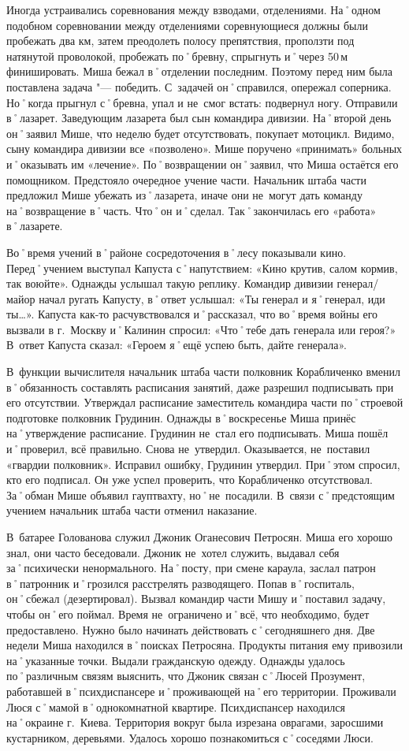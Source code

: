 Иногда устраивались соревнования между взводами, отделениями. На˚одном подобном соревновании между отделениями соревнующиеся должны были пробежать два км, затем преодолеть полосу препятствия, проползти под натянутой проволокой, пробежать по˚бревну, спрыгнуть и˚через 50\,м финишировать. Миша бежал в˚отделении последним. Поэтому перед ним была поставлена задача "--- победить. С~задачей он˚справился, опережал соперника. Но˚когда прыгнул с˚бревна, упал и не~смог встать: подвернул ногу. Отправили в˚лазарет. Заведующим лазарета был сын командира дивизии. На˚второй день он˚заявил Мише, что неделю будет отсутствовать, покупает мотоцикл. Видимо, сыну командира дивизии все «позволено». Мише поручено «принимать» больных и˚оказывать им «лечение». По˚возвращении он˚заявил, что Миша остаётся его помощником. Предстояло очередное учение части. Начальник штаба части предложил Мише убежать из˚лазарета, иначе они не~могут дать команду на˚возвращение в˚часть. Что˚он и˚сделал. Так˚закончилась его «работа» в˚лазарете.

Во˚время учений в˚районе сосредоточения в˚лесу показывали кино. Перед˚учением выступал Капуста с˚напутствием: «Кино крутив, салом кормив, так воюйте». Однажды услышал такую реплику. Командир дивизии генерал\-/майор начал ругать Капусту, в˚ответ услышал: «Ты генерал и я˚генерал, иди ты…». Капуста как-то расчувствовался и˚рассказал, что во˚время войны его вызвали в г.~Москву и˚Калинин спросил: «Что˚тебе дать генерала или героя?» В~ответ Капуста сказал: «Героем я˚ещё успею быть, дайте генерала». 

В~функции вычислителя начальник штаба части полковник Корабличенко вменил в˚обязанность составлять расписания занятий, даже разрешил подписывать при его отсутствии. Утверждал расписание заместитель командира части по˚строевой подготовке полковник Грудинин. Однажды в˚воскресенье Миша принёс на˚утверждение расписание. Грудинин не~стал его подписывать. Миша пошёл и˚проверил, всё правильно. Снова не~утвердил. Оказывается, не~поставил «гвардии полковник». Исправил ошибку, Грудинин утвердил. При˚этом спросил, кто его подписал. Он уже успел проверить, что Корабличенко отсутствовал. За˚обман Мише объявил гауптвахту, но˚не~посадили. В~связи с˚предстоящим учением начальник штаба части отменил наказание.


В~батарее Голованова служил Джоник Оганесович Петросян. Миша его хорошо знал, они часто беседовали. Джоник не~хотел служить, выдавал себя за˚психически ненормального. На˚посту, при смене караула, заслал патрон в˚патронник и˚грозился расстрелять разводящего. Попав в˚госпиталь, он˚сбежал (дезертировал). Вызвал командир части Мишу и˚поставил задачу, чтобы он˚его поймал. Время не~ограничено и˚всё, что необходимо, будет предоставлено. Нужно было начинать действовать с˚сегодняшнего дня. Две недели Миша находился в˚поисках Петросяна. Продукты питания ему привозили на˚указанные точки. Выдали гражданскую одежду. Однажды удалось по˚различным связям выяснить, что Джоник связан с˚Люсей Прозумент, работавшей в˚психдиспансере и˚проживающей на˚его территории. Проживали Люся с˚мамой в˚однокомнатной квартире. Психдиспансер находился на˚окраине г.~Киева. Территория вокруг была изрезана оврагами, заросшими кустарником, деревьями. Удалось хорошо познакомиться с˚соседями Люси. 

